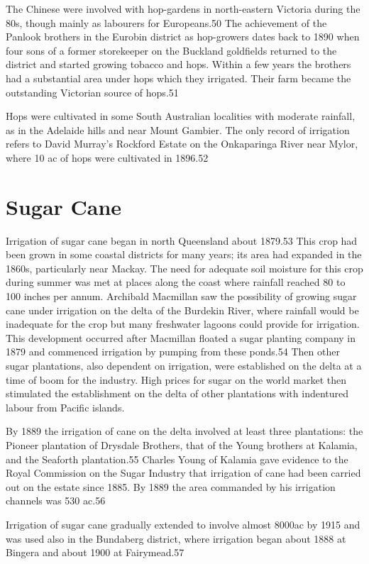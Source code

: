 The Chinese were involved with hop-gardens in north-eastern Victoria
during the 80s, though mainly as labourers for Europeans.50 The
achievement of the Panlook brothers in the Eurobin district as
hop-growers dates back to 1890 when four sons of a former storekeeper
on the Buckland goldfields returned to the district and started
growing tobacco and hops. Within a few years the brothers had a
substantial area under hops which they irrigated. Their farm became
the outstanding Victorian source of hops.51

Hops were cultivated in some South Australian localities with moderate
rainfall, as in the Adelaide hills and near Mount Gambier. The only
record of irrigation refers to David Murray's Rockford Estate on the
Onkaparinga River near Mylor, where 10 ac of hops were cultivated in
1896.52

\section{Sugar Cane}

Irrigation of sugar cane began in north Queensland about 1879.53 This
crop had been grown in some coastal districts for many years; its area
had expanded in the 1860s, particularly near Mackay. The need for
adequate soil moisture for this crop during summer was met at places
along the coast where rainfall reached 80 to 100 inches per
annum. Archibald Macmillan saw the possibility of growing sugar cane
under irrigation on the delta of the Burdekin River, where rainfall
would be inadequate for the crop but many freshwater lagoons could
provide for irrigation. This development occurred after Macmillan
floated a sugar planting company in 1879 and commenced irrigation by
pumping from these ponds.54 Then other sugar plantations, also
dependent on irrigation, were established on the delta at a time of
boom for the industry. High prices for sugar on the world market then
stimulated the establishment on the delta of other plantations with
indentured labour from Pacific islands.

By 1889 the irrigation of cane on the delta involved at least three
plantations: the Pioneer plantation of Drysdale Brothers, that of the
Young brothers at Kalamia, and the Seaforth plantation.55 Charles
Young of Kalamia gave evidence to the Royal Commission on the Sugar
Industry that irrigation of cane had been carried out on the estate
since 1885. By 1889 the area commanded by his irrigation channels was
530 ac.56

Irrigation of sugar cane gradually extended to involve almost 8000ac
by 1915 and was used also in the Bundaberg district, where irrigation
began about 1888 at Bingera and about 1900 at Fairymead.57

